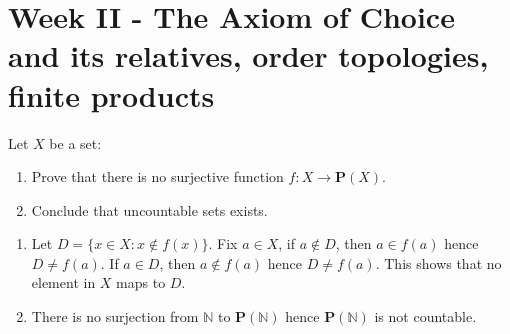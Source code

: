 \documentclass[../main.tex]{subfiles}
\begin{document}
\section{Week II - The Axiom of Choice and its relatives, order topologies, finite products}

\begin{problem}[1]
    Let $X$ be a set:
    \begin{enumerate}[label=(\alph*)]
        \item Prove that there is no surjective function $f : X \to \mathbf{P}(X)$.
        \item Conclude that uncountable sets exists.
    \end{enumerate}
\end{problem}
\begin{enumerate}[label=(\alph*)]
    \item Let $D = \{ x \in X : x \notin f(x) \}$.
        Fix $a \in X$, if $a \notin D$, then $a \in f(a)$ hence $D \ne f(a)$.
        If $a \in D$, then $a \notin f(a)$ hence $D \ne f(a)$.
        This shows that no element in $X$ maps to $D$.
    \item There is no surjection from $\mathbb{N}$ to $\mathbf{P}(\mathbb{N})$ hence $\mathbf{P}(\mathbb{N})$ is not countable.
\end{enumerate}
\end{document}

